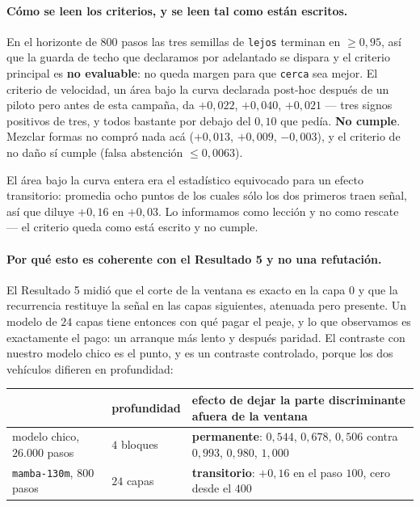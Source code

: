 \documentclass[11pt,a4paper]{article}
\begin{document}
\paragraph{Cómo se leen los criterios, y se leen tal como están escritos.} En el horizonte de $800$
pasos las tres semillas de \texttt{lejos} terminan en $\ge 0{,}95$, así que la guarda de techo que
declaramos por adelantado se dispara y el criterio principal es \textbf{no evaluable}: no queda margen
para que \texttt{cerca} sea mejor. El criterio de velocidad, un área bajo la curva declarada post-hoc
después de un piloto pero antes de esta campaña, da $+0{,}022$, $+0{,}040$, $+0{,}021$ --- tres signos
positivos de tres, y todos bastante por debajo del $0{,}10$ que pedía. \textbf{No cumple}. Mezclar
formas no compró nada acá ($+0{,}013$, $+0{,}009$, $-0{,}003$), y el criterio de no daño sí cumple
(falsa abstención $\le 0{,}0063$).

El área bajo la curva entera era el estadístico equivocado para un efecto transitorio: promedia ocho
puntos de los cuales sólo los dos primeros traen señal, así que diluye $+0{,}16$ en $+0{,}03$. Lo
informamos como lección y no como rescate --- el criterio queda como está escrito y no cumple.

\paragraph{Por qué esto es coherente con el Resultado 5 y no una refutación.} El Resultado 5 midió que
el corte de la ventana es exacto en la capa $0$ y que la recurrencia restituye la señal en las capas
siguientes, atenuada pero presente. Un modelo de $24$ capas tiene entonces con qué pagar el peaje, y
lo que observamos es exactamente el pago: un arranque más lento y después paridad. El contraste con
nuestro modelo chico es el punto, y es un contraste controlado, porque los dos vehículos difieren en
profundidad:

\begin{center}
\begin{tabular}{lll}
\toprule
& profundidad & efecto de dejar la parte discriminante afuera de la ventana \\
\midrule
modelo chico, $26{.}000$ pasos & $4$ bloques & \textbf{permanente}: $0{,}544$, $0{,}678$, $0{,}506$ contra $0{,}993$, $0{,}980$, $1{,}000$ \\
\texttt{mamba-130m}, $800$ pasos & $24$ capas & \textbf{transitorio}: $+0{,}16$ en el paso $100$, cero desde el $400$ \\
\bottomrule
\end{tabular}
\end{center}
\end{document}
